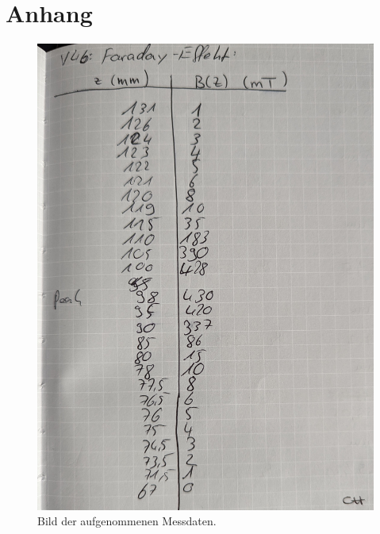 \chapter*{Anhang}
\label{cha:Messdaten}


\begin{figure}[H]
              \centering
              \includegraphics[height=\textheight]{content/v46_pictures/messdaten_1.jpg}
              \caption{Bild der aufgenommenen Messdaten.}
              \label{fig:messdatena}
\end{figure}
